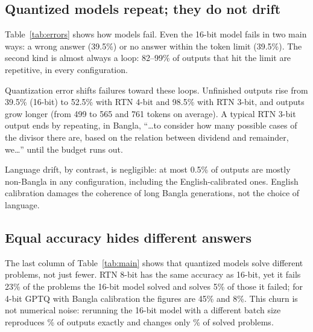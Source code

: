 \documentclass[11pt]{article}
\begin{document}
\subsection{Quantized models repeat; they do not drift}

\begin{table}[t]
\centering
\small
\setlength{\tabcolsep}{3pt}
\caption{Failure types, \% of problems. \emph{Wrong}: incorrect boxed answer. \emph{Limit}: no answer within \MaxNewTokens{} tokens. \emph{Stopped}: ended without an answer. \emph{Repet.}: output contains a repetition loop. \emph{Drift}: mostly non-Bangla output. \emph{Tokens}: mean output length.}
\label{tab:errors}
\end{table}

Table~\ref{tab:errors} shows how models fail. Even the 16-bit model fails in two main ways: a wrong answer (39.5\%) or no answer within the token limit (39.5\%). The second kind is almost always a loop: 82--99\% of outputs that hit the limit are repetitive, in every configuration.

Quantization error shifts failures toward these loops. Unfinished outputs rise from 39.5\% (16-bit) to 52.5\% with RTN 4-bit and 98.5\% with RTN 3-bit, and outputs grow longer (from 499 to 565 and 761 tokens on average). A typical RTN 3-bit output ends by repeating, in Bangla, ``\dots to consider how many possible cases of the divisor there are, based on the relation between dividend and remainder, we\dots'' until the budget runs out.

Language drift, by contrast, is negligible: at most 0.5\% of outputs are mostly non-Bangla in any configuration, including the English-calibrated ones. English calibration damages the coherence of long Bangla generations, not the choice of language.

\subsection{Equal accuracy hides different answers}

The last column of Table~\ref{tab:main} shows that quantized models solve different problems, not just fewer. RTN 8-bit has the same accuracy as 16-bit, yet it fails 23\% of the problems the 16-bit model solved and solves 5\% of those it failed; for 4-bit GPTQ with Bangla calibration the figures are 45\% and 8\%. This churn is not numerical noise: rerunning the 16-bit model with a different batch size reproduces \NoiseIdentical\% of outputs exactly and changes only \NoiseLost\% of solved problems.
\end{document}
